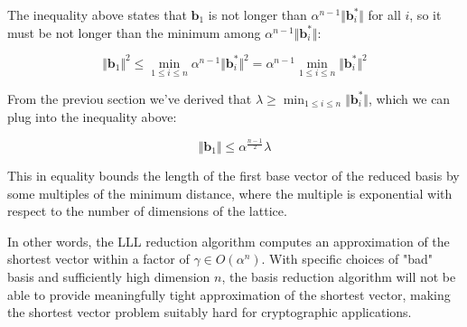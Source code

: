 The inequality above states that $\mathbf{b}_1$ is not longer than $\alpha^{n-1} \Vert \mathbf{b}_{i}^\ast \Vert$ for all $i$, so it must be not longer than the minimum among $\alpha^{n-1} \Vert \mathbf{b}_{i}^\ast \Vert$:

$$
\Vert \mathbf{b}_1 \Vert^2 \leq \min_{1 \leq i \leq n}\alpha^{n-1} \Vert \mathbf{b}_{i}^\ast \Vert^2 = \alpha^{n-1} \min_{1 \leq i \leq n}\Vert \mathbf{b}_{i}^\ast \Vert^2
$$

From the previou section we've derived that $\lambda \geq \min_{1 \leq i \leq n} \Vert \mathbf{b}_i^\ast \Vert$, which we can plug into the inequality above:

$$
\Vert \mathbf{b}_1 \Vert \leq \alpha^\frac{n-1}{2} \lambda
$$

This in equality bounds the length of the first base vector of the reduced basis by some multiples of the minimum distance, where the multiple is exponential with respect to the number of dimensions of the lattice.

In other words, the LLL reduction algorithm computes an approximation of the shortest vector within a factor of $\gamma \in O(\alpha^n)$. With specific choices of "bad" basis and sufficiently high dimension $n$, the basis reduction algorithm will not be able to provide meaningfully tight approximation of the shortest vector, making the shortest vector problem suitably hard for cryptographic applications.


